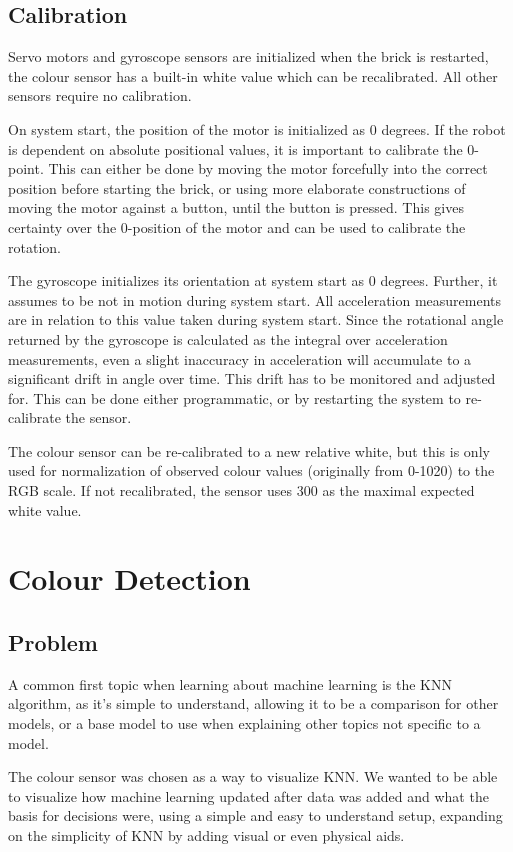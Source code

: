 \documentclass[11pt, a4paper]{article}
\begin{document}
\subsection{Calibration} \label{calibration}
Servo motors and gyroscope sensors are initialized when the brick is restarted, the colour sensor has a built-in white value which can be recalibrated. All other sensors require no calibration.

On system start, the position of the motor is initialized as 0 degrees. If the robot is dependent on absolute positional values, it is important to calibrate the 0-point. This can either be done by moving the motor forcefully into the correct position before starting the brick, or using more elaborate constructions of moving the motor against a button, until the button is pressed. This gives certainty over the 0-position of the motor and can be used to calibrate the rotation.

The gyroscope initializes its orientation at system start as 0 degrees. Further, it assumes to be not in motion during system start. All acceleration measurements are in relation to this value taken during system start. Since the rotational angle returned by the gyroscope is calculated as the integral over acceleration measurements, even a slight inaccuracy in acceleration will accumulate to a significant drift in angle over time. This drift has to be monitored and adjusted for. This can be done either programmatic, or by restarting the system to re-calibrate the sensor.

The colour sensor can be re-calibrated to a new relative white, but this is only used for normalization of observed colour values (originally from 0-1020) to the RGB scale. If not recalibrated, the sensor uses 300 as the maximal expected white value.

\pagebreak
\section{Colour Detection}
\subsection{Problem}
A common first topic when learning about machine learning is the KNN algorithm, as it's simple to understand, allowing it to be a comparison for other models, or a base model to use when explaining other topics not specific to a model.

The colour sensor was chosen as a way to visualize KNN. We wanted to be able to visualize how machine learning updated after data was added and what the basis for decisions were, using a simple and easy to understand setup, expanding on the simplicity of KNN by adding visual or even physical aids.
\end{document}
